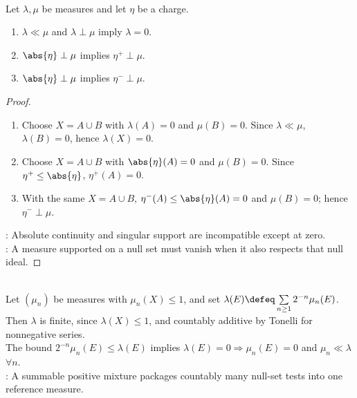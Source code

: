 \begin{corollary} \label{cor:absolute-continuous-singular-zero-measure} \\
Let $\lambda,\mu$ be measures and let $\eta$ be a charge.
\begin{enumerate}[label=(\roman*)]
\setlength{\itemsep}{0pt}
\item $\lambda\ll\mu$ and $\lambda\perp\mu$ imply $\lambda=0$.
\item $\abs{\eta}\perp\mu$ implies $\eta^+\perp\mu$.
\item $\abs{\eta}\perp\mu$ implies $\eta^-\perp\mu$.
\end{enumerate}
\begin{proof}
\begin{enumerate}[label=(\roman*)]
\setlength{\itemsep}{0pt}
\item Choose $X=A\cup B$ with $\lambda(A)=0$ and $\mu(B)=0$. Since $\lambda\ll\mu$, $\lambda(B)=0$, hence $\lambda(X)=0$.
\item Choose $X=A\cup B$ with $\abs{\eta}(A)=0$ and $\mu(B)=0$. Since $\eta^+\leq\abs{\eta}$, $\eta^+(A)=0$.
\item With the same $X=A\cup B$, $\eta^-(A)\leq\abs{\eta}(A)=0$ and $\mu(B)=0$; hence $\eta^-\perp\mu$.
\end{enumerate}
: Absolute continuity and singular support are incompatible except at zero.\\
: A measure supported on a null set must vanish when it also respects that null ideal.
\end{proof}
\end{corollary}

\begin{example} \label{ex:weighted-sum-dominates-countable-measures} \\
Let $(\mu_n)$ be measures with $\mu_n(X)\leq1$, and set $\lambda(E)\defeq\sum\limits_{n\geq1}2^{-n}\mu_n(E)$.\\
Then $\lambda$ is finite, since $\lambda(X)\leq1$, and countably additive by Tonelli for nonnegative series.\\
The bound $2^{-n}\mu_n(E)\leq\lambda(E)$ implies $\lambda(E)=0\Rightarrow\mu_n(E)=0$ and $\mu_n\ll\lambda$ $\forall n$.\\
: A summable positive mixture packages countably many null-set tests into one reference measure.
\end{example}

